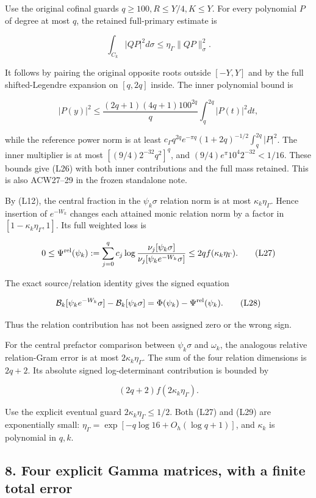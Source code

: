Use the original cofinal guards \(q\ge100,R\le Y/4,K\le Y\). For every polynomial \(P\) of degree at most \(q\), the retained full-primary estimate is

\[
\int_{C_k}|QP|^2d\sigma\le\eta_\Gamma\|QP\|_\sigma^2.
\tag{L26}
\]

It follows by pairing the original opposite roots outside \([-Y,Y]\) and by the full shifted-Legendre expansion on \([q,2q]\) inside. The inner polynomial bound is

\[
|P(y)|^2\le\frac{(2q+1)(4q+1)100^{2q}}q
\int_q^{2q}|P(t)|^2dt,
\]

while the reference power norm is at least
\(c_\Gamma q^{2q}e^{-\pi q}(1+2q)^{-1/2}\int_q^{2q}|P|^2\).
The inner multiplier is at most \([(9/4)2^{-32}q^2]^q\), and
\((9/4)e^\pi10^4 2^{-32}<1/16\). These bounds give (L26) with both inner contributions and the full mass retained. This is also ACW27--29 in the frozen standalone note.

By (L12), the central fraction in the \(\psi_k\sigma\) relation norm is at most \(\kappa_k\eta_\Gamma\). Hence insertion of \(e^{-W_k}\) changes each attained monic relation norm by a factor in
\([1-\kappa_k\eta_\Gamma,1]\). Its full weighted loss is

\[
0\le\Psi^{\rm rel}(\psi_k)
:=\sum_{j=0}^qc_j\log\frac{\nu_j[\psi_k\sigma]}
{\nu_j[\psi_ke^{-W_k}\sigma]}
\le2q f(\kappa_k\eta_\Gamma).
\tag{L27}
\]

The exact source/relation identity gives the signed equation

\[
\mathcal B_k[\psi_ke^{-W_k}\sigma]-\mathcal B_k[\psi_k\sigma]
=\Phi(\psi_k)-\Psi^{\rm rel}(\psi_k).
\tag{L28}
\]

Thus the relation contribution has not been assigned zero or the wrong sign.

For the central prefactor comparison between \(\psi_k\sigma\) and \(\omega_k\), the analogous relative relation-Gram error is at most \(2\kappa_k\eta_\Gamma\). The sum of the four relation dimensions is \(2q+2\). Its absolute signed log-determinant contribution is bounded by

\[
(2q+2)f(2\kappa_k\eta_\Gamma).
\tag{L29}
\]

Use the explicit eventual guard \(2\kappa_k\eta_\Gamma\le1/2\). Both (L27) and (L29) are exponentially small: \(\eta_\Gamma=\exp[-q\log16+O_h(\log q+1)]\), and \(\kappa_k\) is polynomial in \(q,k\).

\subsection{8. Four explicit Gamma matrices, with a finite total error}\label{four-explicit-gamma-matrices-with-a-finite-total-error}

